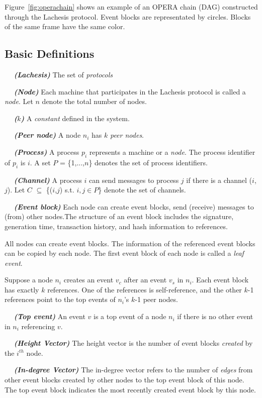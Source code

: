 \documentclass{article}
\newcommand{\dfnn}[2]{$\quad$ \textbf{\emph{(#1)}} {#2}}
\begin{document}
Figure~\ref{fig:operachain} shows an example of an OPERA chain (DAG) constructed through the Lachesis protocol. Event blocks are representated by circles. Blocks of the same frame have the same color.

\subsection{Basic Definitions}

\dfnn{Lachesis}{The set of \emph{protocols}}

\dfnn{Node}{Each machine that participates in the Lachesis protocol is called a \emph{node}. Let $n$ denote the total number of nodes.}

\dfnn{$k$}{A \emph{constant} defined in the system.}

\dfnn{Peer node}{A node $n_i$ has $k$ \emph{peer nodes}.}

\dfnn{Process}{A process $p_i$ represents a machine or a \emph{node}. The process identifier of $p_i$ is $i$. A set $P$ = \{1,...,$n$\} denotes the set of process identifiers.}

\dfnn{Channel}{A process $i$ can send messages to process $j$ if there is a channel ($i$,$j$). Let $C$ $\subseteq$ \{($i$,$j$) s.t. $i,j \in P$\} denote the set of channels.}

\dfnn{Event block}{Each node can create event blocks, send (receive) messages to (from) other nodes.The structure of an event block includes the signature, generation time, transaction history, and hash information to references.}

All nodes can create event blocks. The information of the referenced event blocks can be copied by each node. The first event block of each node is called a \emph{leaf event}.
 
Suppose a node $n_i$ creates an event $v_c$ after an event $v_s$ in $n_i$.  Each event block has exactly $k$ references. One of the references is self-reference, and the other $k$-1 references point to the top events of $n_i$'s $k$-1 peer nodes.

\dfnn{Top event}{An event $v$ is a top event of a node $n_i$ if there is no other event in $n_i$ referencing $v$.}

\dfnn{Height Vector}{The height vector is the number of event blocks \emph{created} by the $i^{th}$ node.}

\dfnn{In-degree Vector}{The in-degree vector refers to the number of \emph{edges} from other event blocks created by other nodes to the top event block of this node. The top event block indicates the most recently created event block by this node.}
\end{document}
